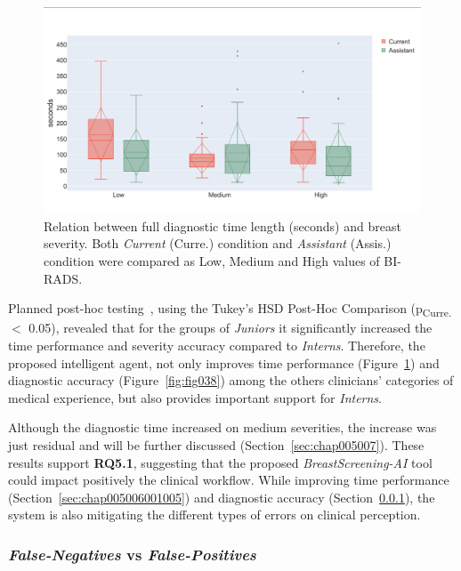 \begin{figure}[ht]
\centering
\includegraphics[width=\columnwidth]{images/fig037}
\caption{Relation between full diagnostic time length (seconds) and breast severity. Both {\it Current} (Curre.) condition and {\it Assistant} (Assis.) condition were compared as Low, Medium and High values of BI-RADS.}
\label{fig:fig037}
\end{figure}

Planned post-hoc testing~\cite{10.1145/2858036.2858360}, using the Tukey's HSD Post-Hoc Comparison (p\textsubscript{Curre.} $<$ 0.05), revealed that for the groups of {\it Juniors} it significantly increased the time performance and severity accuracy compared to {\it Interns}.
Therefore, the proposed intelligent agent, not only improves time performance (Figure~\ref{fig:fig037}) and diagnostic accuracy (Figure~\ref{fig:fig038}) among the others clinicians' categories of medical experience, but also provides important support for {\it Interns}.

Although the diagnostic time increased on medium severities, the increase was just residual and will be further discussed (Section~\ref{sec:chap005007}).
These results support {\bf RQ5.1}, suggesting that the proposed {\it BreastScreening-AI} tool could impact positively the clinical workflow.
While improving time performance (Section~\ref{sec:chap005006001005}) and diagnostic accuracy (Section~\ref{sec:chap005006001006}), the system is also mitigating the different types of errors on clinical perception.

\subsubsection{{\it False-Negatives} vs {\it False-Positives}}
\label{sec:chap005006001006}

